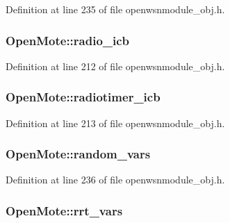 Definition at line 235 of file openwsnmodule\+\_\+obj.\+h.

\subsubsection[{\texorpdfstring{radio\+\_\+icb}{radio_icb}}]{ Open\+Mote\+::radio\+\_\+icb}\hypertarget{struct_open_mote_ac0f941ac98e21115b10e0c1af009eb81}{}\label{struct_open_mote_ac0f941ac98e21115b10e0c1af009eb81}


Definition at line 212 of file openwsnmodule\+\_\+obj.\+h.

\subsubsection[{\texorpdfstring{radiotimer\+\_\+icb}{radiotimer_icb}}]{ Open\+Mote\+::radiotimer\+\_\+icb}\hypertarget{struct_open_mote_a5ceff4b6431ea734d207710a724693f6}{}\label{struct_open_mote_a5ceff4b6431ea734d207710a724693f6}


Definition at line 213 of file openwsnmodule\+\_\+obj.\+h.

\subsubsection[{\texorpdfstring{random\+\_\+vars}{random_vars}}]{ Open\+Mote\+::random\+\_\+vars}\hypertarget{struct_open_mote_ac39c7ed7d81f99bb3759327ecc34b020}{}\label{struct_open_mote_ac39c7ed7d81f99bb3759327ecc34b020}


Definition at line 236 of file openwsnmodule\+\_\+obj.\+h.

\subsubsection[{\texorpdfstring{rrt\+\_\+vars}{rrt_vars}}]{ Open\+Mote\+::rrt\+\_\+vars}\hypertarget{struct_open_mote_ab3971cd4d94d74662025d9551d008cbc}{}\label{struct_open_mote_ab3971cd4d94d74662025d9551d008cbc}


